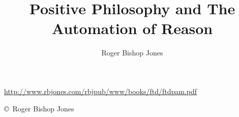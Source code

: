 \documentclass[10pt,a4paper.titlepage,openany,twocolumn]{book}
\author{Roger Bishop Jones}
\title{Positive Philosophy and The Automation of Reason}
\begin{document}
\begin{titlepage}
\maketitle

\vfill

\begin{centering}

{\footnotesize



\href{http://www.rbjones.com/rbjpub/www/books/ftd/ftdpam.pdf}
{http://www.rbjones.com/rbjpub/www/books/ftd/ftdpam.pdf}


\copyright\ Roger Bishop Jones

}%

\end{centering}

\thispagestyle{empty}
\end{titlepage}

\onecolumn


{\parskip=0pt\tableofcontents}

\vfill

\pagebreak

\twocolumn
\end{document}
